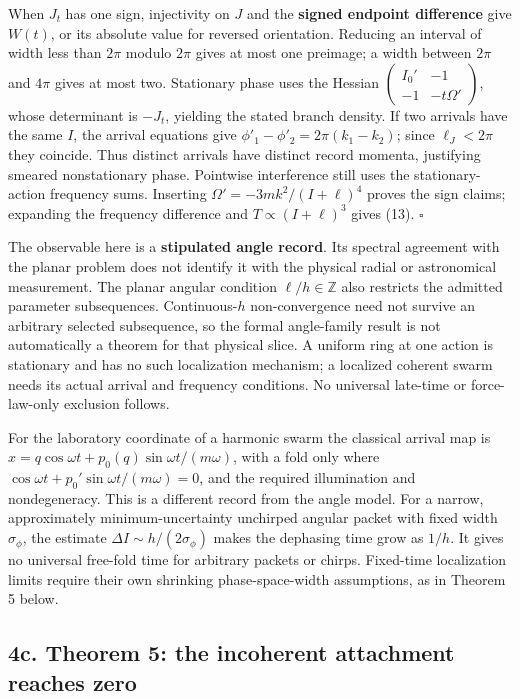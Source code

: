 \documentclass[11pt,a4paper]{article}
\begin{document}
When \(J_t\) has one sign, injectivity on \(J\) and the \textbf{signed
endpoint difference} give \(W(t)\), or its absolute value for reversed
orientation. Reducing an interval of width less than \(2\pi\) modulo
\(2\pi\) gives at most one preimage; a width between \(2\pi\) and
\(4\pi\) gives at most two. Stationary phase uses the Hessian
\(\left(\begin{smallmatrix}I_0'&-1\\-1&-t\Omega'\end{smallmatrix}\right)\),
whose determinant is \(-J_t\), yielding the stated branch density. If
two arrivals have the same \(I\), the arrival equations give
\(\phi'_1-\phi'_2=2\pi(k_1-k_2)\); since \(\ell_J<2\pi\) they coincide.
Thus distinct arrivals have distinct record momenta, justifying smeared
nonstationary phase. Pointwise interference still uses the
stationary-action frequency sums. Inserting
\(\Omega'=-3mk^2/(I+\ell)^4\) proves the sign claims; expanding the
frequency difference and \(T\propto(I+\ell)^3\) gives (13). \(\square\)

The observable here is a \textbf{stipulated angle record}. Its spectral
agreement with the planar problem does not identify it with the physical
radial or astronomical measurement. The planar angular condition
\(\ell/h\in\mathbb Z\) also restricts the admitted parameter
subsequences. Continuous-\(h\) non-convergence need not survive an
arbitrary selected subsequence, so the formal angle-family result is not
automatically a theorem for that physical slice. A uniform ring at one
action is stationary and has no such localization mechanism; a localized
coherent swarm needs its actual arrival and frequency conditions. No
universal late-time or force-law-only exclusion follows.

For the laboratory coordinate of a harmonic swarm the classical arrival
map is \(x=q\cos\omega t+p_0(q)\sin\omega t/(m\omega)\), with a fold
only where \(\cos\omega t+p_0'\sin\omega t/(m\omega)=0\), and the
required illumination and nondegeneracy. This is a different record from
the angle model. For a narrow, approximately minimum-uncertainty
unchirped angular packet with fixed width \(\sigma_\phi\), the estimate
\(\Delta I\sim h/(2\sigma_\phi)\) makes the dephasing time grow as
\(1/h\). It gives no universal free-fold time for arbitrary packets or
chirps. Fixed-time localization limits require their own shrinking
phase-space-width assumptions, as in Theorem 5 below.

\hypertarget{c.-theorem-5-the-incoherent-attachment-reaches-zero}{%
\subsection{4c. Theorem 5: the incoherent attachment reaches
zero}\label{c.-theorem-5-the-incoherent-attachment-reaches-zero}}
\end{document}
